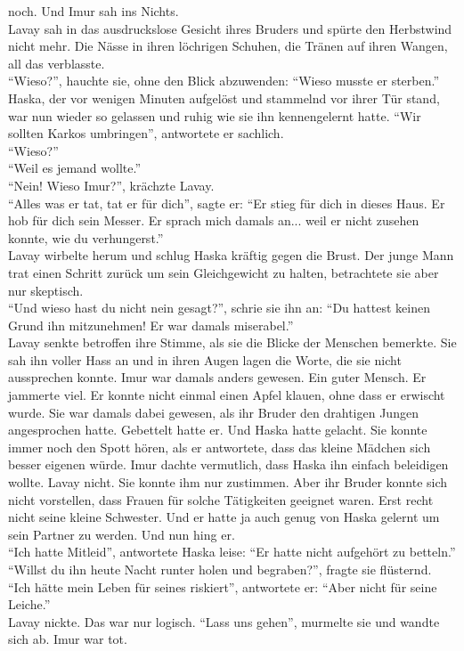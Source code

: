 noch. Und Imur sah ins Nichts.\\
Lavay sah in das ausdruckslose Gesicht ihres Bruders und spürte den Herbstwind nicht mehr. Die 
Nässe in ihren löchrigen Schuhen, die Tränen auf ihren Wangen, all das verblasste. \\
``Wieso?'', hauchte sie, ohne den Blick abzuwenden: ``Wieso musste er sterben.''\\
Haska, der vor wenigen Minuten aufgelöst und stammelnd vor ihrer Tür stand, war nun 
wieder so gelassen und ruhig wie sie ihn kennengelernt hatte. ``Wir sollten Karkos umbringen'', 
antwortete er sachlich.\\
``Wieso?''\\
``Weil es jemand wollte.''\\
``Nein! Wieso Imur?'', krächzte Lavay.\\
``Alles was er tat, tat er für dich'', sagte er: ``Er stieg für dich in dieses Haus. Er hob für 
dich sein Messer. Er sprach mich damals an... weil er nicht zusehen konnte, wie du verhungerst.''\\
Lavay wirbelte herum und schlug Haska kräftig gegen die Brust. Der junge Mann trat einen Schritt 
zurück um sein Gleichgewicht zu halten, betrachtete sie aber nur skeptisch. \\
``Und wieso hast du nicht nein gesagt?'', schrie sie ihn an: ``Du hattest keinen Grund ihn 
mitzunehmen! Er war damals miserabel.''\\
Lavay senkte betroffen ihre Stimme, als sie die Blicke der Menschen bemerkte. Sie sah ihn voller 
Hass an und in ihren Augen lagen die Worte, die sie nicht aussprechen konnte. Imur war damals 
anders gewesen. Ein guter Mensch. Er jammerte viel. Er konnte nicht einmal einen Apfel klauen, ohne 
dass er erwischt wurde. Sie war damals dabei gewesen, als ihr Bruder den drahtigen Jungen 
angesprochen hatte. Gebettelt hatte er. Und Haska hatte gelacht. Sie konnte immer noch den Spott 
hören, als er antwortete, dass das kleine Mädchen sich besser eigenen würde. Imur dachte vermutlich, 
dass Haska ihn einfach beleidigen wollte. Lavay nicht. Sie konnte ihm nur zustimmen. Aber ihr Bruder 
konnte sich nicht vorstellen, dass Frauen für solche Tätigkeiten geeignet waren. Erst recht nicht 
seine kleine Schwester. Und er hatte ja auch genug von Haska gelernt um sein Partner zu werden. Und 
nun hing er. \\
``Ich hatte Mitleid'', antwortete Haska leise: ``Er hatte nicht aufgehört zu betteln.''\\
``Willst du ihn heute Nacht runter holen und begraben?'', fragte sie flüsternd.\\
``Ich hätte mein Leben für seines riskiert'', antwortete er: ``Aber nicht für seine Leiche.''\\
Lavay nickte. Das war nur logisch. ``Lass uns gehen'', murmelte sie und wandte sich ab. Imur war 
tot. \\

